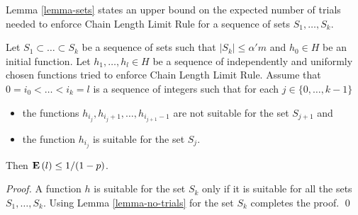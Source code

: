 Lemma \ref{lemma-sets} states an upper bound on the expected number of trials needed to enforce Chain Length Limit Rule for a sequence of sets $S_1, \dots, S_k$.
\begin{lemma}
\label{lemma-sets}
Let $S_1 \subset \dots \subset S_k$ be a sequence of sets such that $|S_k| \leq \alpha' m$ and $h_0 \in H$ be an initial function. Let $h_1, \dots, h_l \in H$ be a sequence of independently and uniformly chosen functions tried to enforce Chain Length Limit Rule. Assume that $0 = i_0 < \dots < i_k = l$ is a sequence of integers such that for each $j \in \{0, \dots, k - 1\}$
\begin{itemize}
\item the functions $h_{i_{j}}, h_{i_{j} + 1}, \dots, h_{i_{j + 1} - 1}$ are not suitable for the set $S_{j + 1}$ and 
\item the function $h_{i_{j}}$ is suitable for the set $S_j$.
\end{itemize}
Then $\mathbf{E}\left(l\right) \leq {1}/{(1 - p)}$.
\end{lemma}
\begin{proof}
A function $h$ is suitable for the set $S_k$ only if it is suitable for all the sets $S_1, \dots, S_k$. Using Lemma \ref{lemma-no-trials} for the set $S_k$ completes the proof.
\qed
\end{proof}


